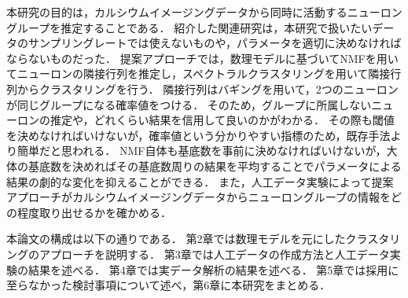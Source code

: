 本研究の目的は，カルシウムイメージングデータから同時に活動するニューロングループを推定することである．
紹介した関連研究は，本研究で扱いたいデータのサンプリングレートでは使えないものや，パラメータを適切に決めなければならないものだった．
提案アプローチでは，数理モデルに基づいてNMFを用いてニューロンの隣接行列を推定し，スペクトラルクラスタリングを用いて隣接行列からクラスタリングを行う．
隣接行列はバギングを用いて，2つのニューロンが同じグループになる確率値をつける．
そのため，グループに所属しないニューロンの推定や，どれくらい結果を信用して良いのかがわかる．
その際も閾値を決めなければいけないが，確率値という分かりやすい指標のため，既存手法より簡単だと思われる．
NMF自体も基底数を事前に決めなければいけないが，大体の基底数を決めればその基底数周りの結果を平均することでパラメータによる結果の劇的な変化を抑えることができる．
また，人工データ実験によって提案アプローチがカルシウムイメージングデータからニューロングループの情報をどの程度取り出せるかを確かめる．

本論文の構成は以下の通りである．
第2章では数理モデルを元にしたクラスタリングのアプローチを説明する．
第3章では人工データの作成方法と人工データ実験の結果を述べる．
第4章では実データ解析の結果を述べる．
第5章では採用に至らなかった検討事項について述べ，第6章に本研究をまとめる．
